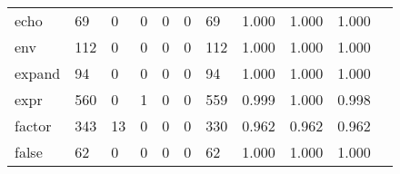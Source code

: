 \begin{longtable}{lp{1.2cm}p{1.2cm}p{1.2cm}p{1.2cm}p{1.2cm}p{1.2cm}p{1.2cm}p{1.2cm}p{1.2cm}p{1.2cm}}
echo      &                                    69 &                                                  0 &                                                  0 &                                                  0 &                                                  0 &                                                 69 &                                         1.000 &                                              1.000 &                                              1.000 \\
env       &                                   112 &                                                  0 &                                                  0 &                                                  0 &                                                  0 &                                                112 &                                         1.000 &                                              1.000 &                                              1.000 \\
expand    &                                    94 &                                                  0 &                                                  0 &                                                  0 &                                                  0 &                                                 94 &                                         1.000 &                                              1.000 &                                              1.000 \\
expr      &                                   560 &                                                  0 &                                                  1 &                                                  0 &                                                  0 &                                                559 &                                         0.999 &                                              1.000 &                                              0.998 \\
factor    &                                   343 &                                                 13 &                                                  0 &                                                  0 &                                                  0 &                                                330 &                                         0.962 &                                              0.962 &                                              0.962 \\
false     &                                    62 &                                                  0 &                                                  0 &                                                  0 &                                                  0 &                                                 62 &                                         1.000 &                                              1.000 &                                              1.000 \\

\end{longtable}
